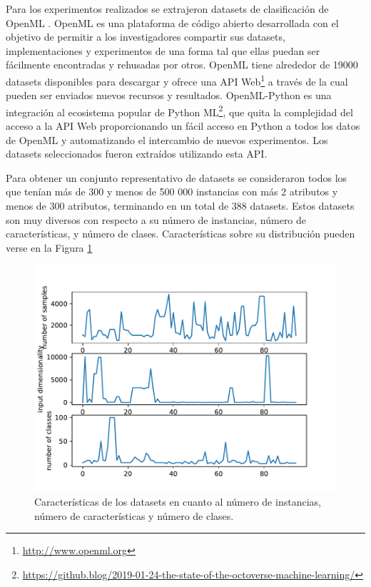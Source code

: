 Para los experimentos realizados se extrajeron datasets de clasificación de OpenML \cite{vanschoren2014openml}. OpenML es una plataforma de código abierto desarrollada con el objetivo de permitir a los investigadores compartir sus datasets, implementaciones y experimentos de una forma tal que ellas puedan ser fácilmente encontradas y rehusadas por otros. OpenML tiene alrededor de 19000 datasets disponibles para descargar y ofrece una API Web\footnote{\url{http://www.openml.org}} a través de la cual pueden ser enviados nuevos recursos y resultados. OpenML-Python \cite{feurer2019openmlpy} es una integración al ecosistema popular de Python ML\footnote{\url{https://github.blog/2019-01-24-the-state-of-the-octoverse-machine-learning/}}, que quita la complejidad del acceso a la API Web proporcionando un fácil acceso en Python a todos los datos de OpenML y automatizando el intercambio de nuevos experimentos. Los datasets seleccionados fueron extraídos utilizando esta API.
 
 Para obtener un conjunto representativo de datasets se consideraron todos los que tenían más de 300  y menos de 500 000 instancias con más 2 atributos y menos de 300 atributos, terminando en un total de 388 datasets. Estos datasets son muy diversos con respecto a su número de instancias, número de características, y número de clases. Características sobre su distribución pueden verse en la Figura \ref{fig:datasets}
 
 \begin{figure}[H]
\centering
\includegraphics[scale=.75]{Figures/mtf-lineplot.pdf}
\caption{Características de los datasets en cuanto al número de instancias, número de características y número de clases.}
\label{fig:datasets}
\end{figure}
 
